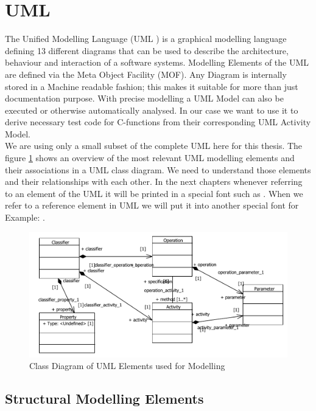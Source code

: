 \section{UML}
The Unified Modelling Language (UML \texttrademark ) is a graphical modelling language defining 13 different diagrams that can be used to describe the architecture, behaviour and interaction of a software systems. Modelling Elements of the UML are defined via the Meta Object Facility (MOF). Any Diagram is internally stored in a Machine readable fashion; this makes it suitable for more than just documentation purpose. With precise modelling a UML Model can also be executed or otherwise automatically analysed. In our case we want to use it to derive necessary test code for C-functions from their corresponding UML Activity Model. \\ We are using only a small subset of the complete UML here for this thesis. The figure \ref{relevantUMLClassDiagram} shows an overview of the most relevant UML modelling elements and their associations in a UML class diagram. We need to understand those elements and their relationships with each other. In the next chapters whenever referring to an element of the UML it will be printed in a special font such as . When we refer to a reference element in UML we will put it into another special font for Example: .
\begin{figure}\label{relevantUMLClassDiagram}
\includegraphics[width=\textwidth]{./pics/relevantUML.pdf}
\caption{Class Diagram of UML Elements used for Modelling}
\end{figure}
\subsection{Structural Modelling Elements}
